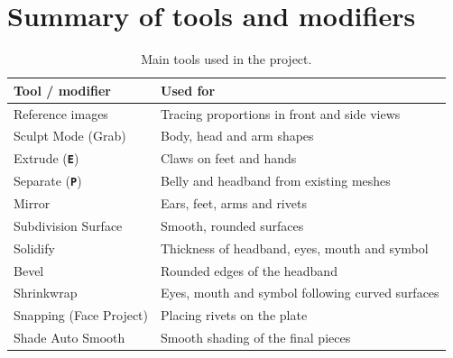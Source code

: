 \documentclass[11pt,a4paper]{article}
\newcommand{\key}[1]{\texttt{\textbf{#1}}}
\begin{document}
\section{Summary of tools and modifiers}
\begin{table}[H]
\centering
\begin{tabular}{@{}ll@{}}
\toprule
\textbf{Tool / modifier} & \textbf{Used for} \\
\midrule
Reference images        & Tracing proportions in front and side views \\
Sculpt Mode (Grab)      & Body, head and arm shapes \\
Extrude (\key{E})       & Claws on feet and hands \\
Separate (\key{P})      & Belly and headband from existing meshes \\
Mirror                  & Ears, feet, arms and rivets \\
Subdivision Surface     & Smooth, rounded surfaces \\
Solidify                & Thickness of headband, eyes, mouth and symbol \\
Bevel                   & Rounded edges of the headband \\
Shrinkwrap              & Eyes, mouth and symbol following curved surfaces \\
Snapping (Face Project) & Placing rivets on the plate \\
Shade Auto Smooth       & Smooth shading of the final pieces \\
\bottomrule
\end{tabular}
\caption{Main tools used in the project.}
\end{table}
\end{document}
